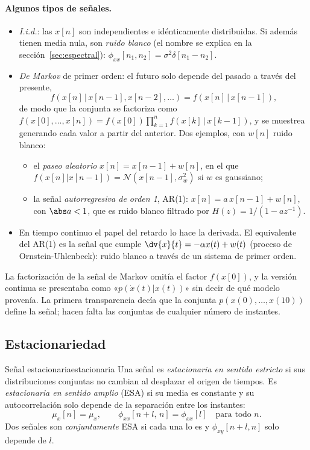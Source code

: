 \documentclass[11pt,a4paper]{scrartcl}
\begin{document}
\paragraph{Algunos tipos de señales.}
\begin{itemize}
  \item \emph{I.i.d.}: las $x[n]$ son independientes e idénticamente distribuidas. Si además tienen media nula, son \emph{ruido blanco} (el nombre se explica en la sección~\ref{sec:espectral}): $\phi_{xx}[n_1,n_2]=\sigma^2\delta[n_1-n_2]$.
  \item \emph{De Markov} de primer orden: el futuro solo depende del pasado a través del presente,
  \[
    f(x[n]\,|\,x[n-1],x[n-2],\dots)=f(x[n]\,|\,x[n-1]),
  \]
  de modo que la conjunta se factoriza como $f(x[0],\dots,x[n])=f(x[0])\prod_{k=1}^nf(x[k]\,|\,x[k-1])$, y se muestrea generando cada valor a partir del anterior. Dos ejemplos, con $w[n]$ ruido blanco:
  \begin{itemize}
    \item el \emph{paseo aleatorio} $x[n]=x[n-1]+w[n]$, en el que $f(x[n]|x[n-1])=\mathcal N(x[n-1],\sigma_w^2)$ si $w$ es gaussiano;
    \item la señal \emph{autorregresiva de orden 1}, AR(1): $x[n]=a\,x[n-1]+w[n]$, con $\abs a<1$, que es ruido blanco filtrado por $H(z)=1/(1-az^{-1})$.
  \end{itemize}
  \item En tiempo continuo el papel del retardo lo hace la derivada. El equivalente del AR(1) es la señal que cumple $\dv{x}{t}=-\alpha x(t)+w(t)$ (proceso de Ornstein-Uhlenbeck): ruido blanco a través de un sistema de primer orden.
\end{itemize}

\begin{errata}
  La factorización de la señal de Markov omitía el factor $f(x[0])$, y la versión continua se presentaba como «$p(\dot x(t)|x(t))$» sin decir de qué modelo provenía. La primera transparencia decía que la conjunta $p(x(0),\dots,x(10))$ define la señal; hacen falta las conjuntas de cualquier número de instantes.
\end{errata}

\subsection{Estacionariedad}

\begin{definicion}{Señal estacionaria}{estacionaria}
  Una señal es \emph{estacionaria en sentido estricto} si sus distribuciones conjuntas no cambian al desplazar el origen de tiempos. Es \emph{estacionaria en sentido amplio} (ESA) si su media es constante y su autocorrelación solo depende de la separación entre los instantes:
  \[
    \mu_x[n]=\mu_x,\qquad\phi_{xx}[n+l,\,n]=\phi_{xx}[l]\quad\text{para todo }n .
  \]
  Dos señales son \emph{conjuntamente} ESA si cada una lo es y $\phi_{xy}[n+l,n]$ solo depende de $l$.
\end{definicion}
\end{document}
